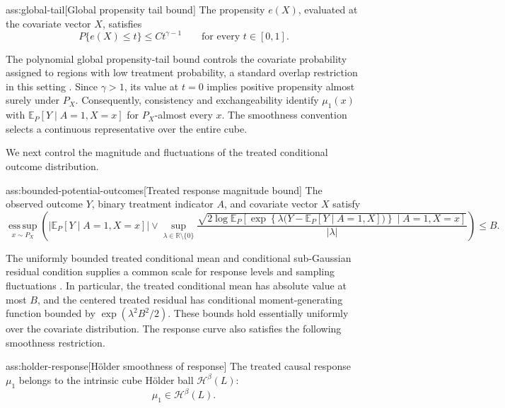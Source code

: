\begin{assumptionv}{ass:global-tail}[Global propensity tail bound]
The propensity \(e(X)\), evaluated at the covariate vector \(X\), satisfies
\[
P\{e(X)\le t\}\le Ct^{\gamma-1}
\qquad\text{for every }t\in[0,1].
\]
\end{assumptionv}

The polynomial global propensity-tail bound controls the covariate probability assigned to regions with low treatment probability, a standard overlap restriction in this setting \citep{Dorn2026GlobalOverlap}. Since \(\gamma>1\), its value at \(t=0\) implies positive propensity almost surely under \(P_X\). Consequently, consistency and exchangeability identify \(\mu_1(x)\) with \(\mathbb E_P[Y\mid A=1,X=x]\) for \(P_X\)-almost every \(x\). The smoothness convention selects a continuous representative over the entire cube.

We next control the magnitude and fluctuations of the treated conditional outcome distribution.

\begin{assumptionv}{ass:bounded-potential-outcomes}[Treated response magnitude bound]
The observed outcome \(Y\), binary treatment indicator \(A\), and covariate vector \(X\) satisfy
\[
\operatorname*{ess\,sup}_{x\sim P_X}
\left(
 \left|\mathbb E_P[Y\mid A=1,X=x]\right|
 \vee
 \sup_{\lambda\in\mathbb R\setminus\{0\}}
 \frac{\sqrt{2\log \mathbb E_P\!\left[
   \exp\!\left\{\lambda\bigl(Y-\mathbb E_P[Y\mid A=1,X]\bigr)\right\}
   \mid A=1,X=x\right]}}{|\lambda|}
\right)
\le B.
\]
\end{assumptionv}

The uniformly bounded treated conditional mean and conditional sub-Gaussian residual condition supplies a common scale for response levels and sampling fluctuations \citep{Dorn2026GlobalOverlap}. In particular, the treated conditional mean has absolute value at most \(B\), and the centered treated residual has conditional moment-generating function bounded by \(\exp(\lambda^2B^2/2)\). These bounds hold essentially uniformly over the covariate distribution. The response curve also satisfies the following smoothness restriction.

\begin{assumptionv}{ass:holder-response}[Hölder smoothness of response]
The treated causal response \(\mu_1\) belongs to the intrinsic cube Hölder ball \(\mathcal H^\beta(L)\):
\[
\mu_1\in\mathcal H^\beta(L).
\]
\end{assumptionv}


